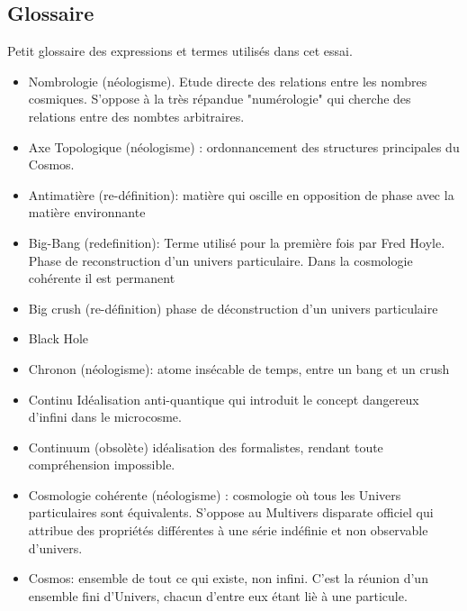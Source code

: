 \documentclass[a4paper,12pt]{article}
\begin{document}
\begin{appendix}


\section{Glossaire}

Petit glossaire des expressions et termes utilisés dans cet essai.

\begin{itemize}

\item Nombrologie (néologisme). Etude directe des relations entre les nombres cosmiques. S'oppose à la très répandue "numérologie" qui cherche des relations entre des nombtes arbitraires.
\item Axe Topologique (néologisme) : ordonnancement des structures principales du Cosmos.
\item Antimatière (re-définition): matière qui oscille en opposition de phase avec la matière environnante
\item Big-Bang (redefinition): Terme utilisé pour la première fois par Fred Hoyle. Phase de reconstruction d’un univers particulaire. Dans la cosmologie cohérente il est permanent
\item Big crush (re-définition) phase de déconstruction d’un univers particulaire
\item Black Hole
\item Chronon (néologisme): atome insécable de temps, entre un bang et un crush

\item Continu Idéalisation anti-quantique qui introduit le concept dangereux d'infini dans le microcosme.

\item Continuum (obsolète) idéalisation des formalistes, rendant toute compréhension impossible.

\item Cosmologie cohérente (néologisme) : cosmologie où tous les Univers particulaires sont équivalents. S’oppose au Multivers disparate officiel qui attribue des propriétés différentes à une série indéfinie et non observable d’univers.

\item Cosmos: ensemble de tout ce qui existe, non infini. C'est la réunion d'un ensemble fini d'Univers, chacun d'entre eux étant liè à une particule.


\end{itemize}
\end{appendix}
\end{document}
